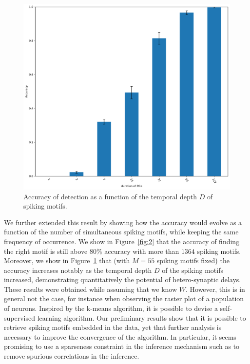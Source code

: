\documentclass[11pt]{article}
\begin{document}
\begin{figure}
\vspace{-10pt}
\includegraphics[width=\linewidth]{figure_N_PG_time.pdf}
{
\caption{Accuracy of detection as a function of the temporal depth $D$ of spiking motifs.
}
\label{fig:3}
}
\end{figure}
We further extended this result by showing how the accuracy would evolve as a function of the number of simultaneous spiking motifs, while keeping the same frequency of occurrence. We show in Figure~\ref{fig:2} that the accuracy of finding the right motif is still above $80\%$ accuracy with more than $1364$ spiking motifs. Moreover, we show in Figure~\ref{fig:3} that (with $M=55$ spiking motifs fixed) the accuracy increases notably as the temporal depth $D$ of the spiking motifs increased, demonstrating quantitatively the potential of hetero-synaptic delays. These results were obtained while assuming that we know $W$. However, this is in general not the case, for instance when observing the raster plot of a population of neurons. Inspired by the k-means algorithm, it is possible to devise a self-supervised learning algorithm. Our preliminary results show that it is possible to retrieve spiking motifs embedded in the data, yet that further analysis is necessary to improve the convergence of the algorithm. In particular, it seems promising to use a sparseness constraint in the inference mechanism such as to remove spurious correlations in the inference.
\end{document}
